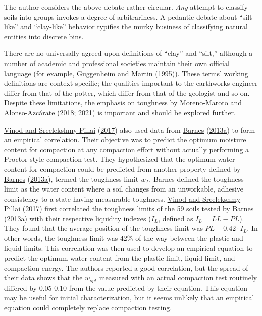 \documentclass[
  letterpaper,
  openany]{book}
\begin{document}
The author considers the above debate rather circular.
\emph{Any} attempt to classify soils into groups invokes a degree of arbitrariness.
A pedantic debate about ``silt-like'' and ``clay-like'' behavior typifies the murky business of classifying natural entities into discrete bins.

There are no universally agreed-upon definitions of ``clay'' and ``silt,'' although a number of academic and professional societies maintain their own official language (for example, \protect\hyperlink{ref-Guggenheim1995}{Guggenheim and Martin} (\protect\hyperlink{ref-Guggenheim1995}{1995})). These terms' working definitions are context-specific; the qualities important to the earthworks engineer differ from that of the potter, which differ from that of the geologist and so on.
Despite these limitations, the emphasis on toughness by Moreno-Maroto and Alonso-Azcárate (\protect\hyperlink{ref-Moreno-Maroto2018}{2018}; \protect\hyperlink{ref-Moreno-Maroto2021}{2021}) is important and should be explored further.

\protect\hyperlink{ref-Vinod2017}{Vinod and Sreelekshmy Pillai} (\protect\hyperlink{ref-Vinod2017}{2017}) also used data from \protect\hyperlink{ref-Barnes2013}{Barnes} (\protect\hyperlink{ref-Barnes2013}{2013a}) to form an empirical correlation.
Their objective was to predict the optimum moisture content for compaction at any compaction effort without actually performing a Proctor-style compaction test. They hypothesized that the optimum water content for compaction could be predicted from another property defined by \protect\hyperlink{ref-Barnes2013}{Barnes} (\protect\hyperlink{ref-Barnes2013}{2013a}), termed the toughness limit \(w_T\).
Barnes defined the toughness limit as the water content where a soil changes from an unworkable, adhesive consistency to a state having measurable toughness.
\protect\hyperlink{ref-Vinod2017}{Vinod and Sreelekshmy Pillai} (\protect\hyperlink{ref-Vinod2017}{2017}) first correlated the toughness limits of the 59 soils tested by \protect\hyperlink{ref-Barnes2013}{Barnes} (\protect\hyperlink{ref-Barnes2013}{2013a}) with their respective liquidity indexes (\(I_L\), defined as \(I_L=LL - PL\)).
They found that the average position of the toughness limit was \(PL + 0.42 \cdot I_L\).
In other words, the toughness limit was 42\% of the way between the plastic and liquid limits.
This correlation was then used to develop an empirical equation to predict the optimum water content from the plastic limit, liquid limit, and compaction energy.
The authors reported a good correlation, but the spread of their data shows that the \(w_{opt}\) measured with an actual compaction test routinely differed by 0.05-0.10 from the value predicted by their equation.
This equation may be useful for initial characterization, but it seems unlikely that an empirical equation could completely replace compaction testing.
\end{document}
